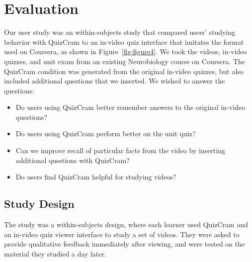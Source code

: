 \documentclass{chi-ext}
\begin{document}

\section{Evaluation}
Our user study was an within-subjects study that compared users' studying behavior with QuizCram to an in-video quiz interface that imitates the format used on Coursera, as shown in Figure~\ref{fig:figure4}. We took the videos, in-video quizzes, and unit exam from an existing Neurobiology course on Coursera. The QuizCram condition was generated from the original in-video quizzes, but also included additional questions that we inserted. We wished to answer the questions:

\begin{itemize}
\item Do users using QuizCram better remember answers to the original in-video questions?
\item Do users using QuizCram perform better on the unit quiz?
\item Can we improve recall of particular facts from the video by inserting additional questions with QuizCram?
\item Do users find QuizCram helpful for studying videos?
\end{itemize}

\subsection{Study Design}

The study was a within-subjects design, where each learner used QuizCram and an in-video quiz viewer interface to study a set of videos. They were asked to provide qualitative feedback immediately after viewing, and were tested on the material they studied a day later.
\end{document}
